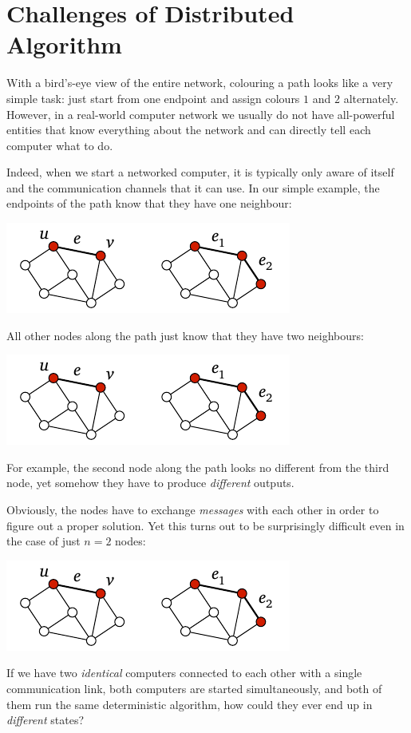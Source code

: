 \section{Challenges of Distributed Algorithm}\label{sec:intro-challenges}

With a bird's-eye view of the entire network, colouring a path looks like a very simple task: just start from one endpoint and assign colours $1$ and $2$ alternately. However, in a real-world computer network we usually do not have all-powerful entities that know everything about the network and can directly tell each computer what to do.

Indeed, when we start a networked computer, it is typically only aware of itself and the communication channels that it can use. In our simple example, the endpoints of the path know that they have one neighbour:
\begin{center}
    \includegraphics[page=\PIntroDegOne]{figs.pdf}
\end{center}
All other nodes along the path just know that they have two neighbours:
\begin{center}
    \includegraphics[page=\PIntroDegTwo]{figs.pdf}
\end{center}
For example, the second node along the path looks no different from the third node, yet somehow they have to produce \emph{different} outputs.

Obviously, the nodes have to exchange \emph{messages} with each other in order to figure out a proper solution. Yet this turns out to be surprisingly difficult even in the case of just $n = 2$ nodes:
\begin{center}
    \includegraphics[page=\PIntroTwo]{figs.pdf}
\end{center}
If we have two \emph{identical} computers connected to each other with a single communication link, both computers are started simultaneously, and both of them run the same deterministic algorithm, how could they ever end up in \emph{different} states?

